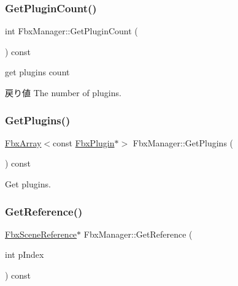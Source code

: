 \mbox{\label{class_fbx_manager_a580c44f170d7e41060891fccb3710d21}} 
\subsubsection{\texorpdfstring{Get\+Plugin\+Count()}{GetPluginCount()}}
{\footnotesize\ttfamily int Fbx\+Manager\+::\+Get\+Plugin\+Count (\begin{DoxyParamCaption}{ }\end{DoxyParamCaption}) const}

get plugins count \begin{DoxyReturn}{戻り値}
The number of plugins. 
\end{DoxyReturn}
\mbox{\label{class_fbx_manager_a0b53702773e0a9b9bf283a315f7f2dce}} 
\subsubsection{\texorpdfstring{Get\+Plugins()}{GetPlugins()}}
{\footnotesize\ttfamily \hyperlink{class_fbx_array}{Fbx\+Array}$<$const \hyperlink{class_fbx_plugin}{Fbx\+Plugin}$\ast$$>$ Fbx\+Manager\+::\+Get\+Plugins (\begin{DoxyParamCaption}{ }\end{DoxyParamCaption}) const}



Get plugins. 

\mbox{\label{class_fbx_manager_a2c99b023b62bfa5fee82328d1826762f}} 
\subsubsection{\texorpdfstring{Get\+Reference()}{GetReference()}}
{\footnotesize\ttfamily \hyperlink{class_fbx_scene_reference}{Fbx\+Scene\+Reference}$\ast$ Fbx\+Manager\+::\+Get\+Reference (\begin{DoxyParamCaption}\item[{int}]{p\+Index }\end{DoxyParamCaption}) const}

